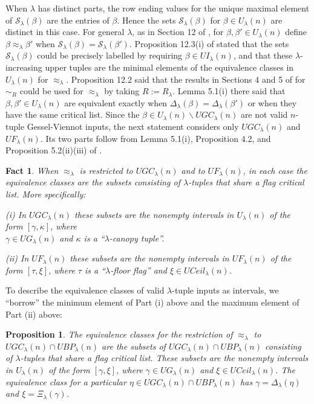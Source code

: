 \documentclass[11pt]{article}
\newtheorem{prop}[thm]{Proposition}
\newtheorem{fact}[thm]{Fact}
\theoremstyle{definition}
\theoremstyle{remark}
\numberwithin{equation}{section}
\begin{document}
\begin{spacing}{1.35}
When $\lambda$ has distinct parts, the row ending values for the unique maximal element of $\mathcal{S}_\lambda(\beta)$ are the entries of $\beta$.  Hence the sets $\mathcal{S}_\lambda(\beta)$ for $\beta \in U_\lambda(n)$ are distinct in this case.  For general $\lambda$, as in Section 12 of \cite{PW}, for $\beta, \beta' \in U_\lambda(n)$ define $\beta \approx_\lambda \beta'$ when $\mathcal{S}_\lambda(\beta) = \mathcal{S}_\lambda(\beta')$.  Proposition 12.3(i) of \cite{PW} stated that the sets $\mathcal{S}_\lambda(\beta)$ could be precisely labelled by requiring $\beta \in UI_\lambda(n)$, and that these $\lambda$-increasing upper tuples are the minimal elements of the equivalence classes in $U_\lambda(n)$ for $\approx_\lambda$.  Proposition 12.2 said that the results in Sections 4 and 5 of \cite{PW} for $\sim_R$ could be used for $\approx_\lambda$ by taking $R := R_\lambda$.  Lemma 5.1(i) there said that $\beta, \beta' \in U_\lambda(n)$ are equivalent exactly when $\Delta_\lambda(\beta) = \Delta_\lambda(\beta')$ or when they have the same critical list.  Since the $\beta \in U_\lambda(n) \backslash UGC_\lambda(n)$ are not valid $n$-tuple Gessel-Viennot inputs, the next statement considers only $UGC_\lambda(n)$ and $UF_\lambda(n)$.  Its two parts follow from Lemma 5.1(i), Proposition 4.2, and Proposition 5.2(ii)(iii) of \cite{PW}.

\begin{fact}\label{fact826.3}When $\approx_\lambda$ is restricted to $UGC_\lambda(n)$ and to $UF_\lambda(n)$, in each case the equivalence classes are the subsets consisting of $\lambda$-tuples that share a flag critical list.  More specifically:

\noindent (i)  In $UGC_\lambda(n)$ these subsets are the nonempty intervals in $U_\lambda(n)$ of the form $[\gamma, \kappa]$, where \\ $\gamma \in UG_\lambda(n)$ and $\kappa$ is a ``$\lambda$-canopy tuple''.

\noindent(ii)  In $UF_\lambda(n)$ these subsets are the nonempty intervals in $UF_\lambda(n)$ of the form $[\tau, \xi]$, where $\tau$ is a ``$\lambda$-floor flag'' and $\xi \in UCeil_\lambda(n)$.  \end{fact}



To describe the equivalence classes of valid $\lambda$-tuple inputs as intervals, we ``borrow'' the minimum element of Part (i) above and the maximum element of Part (ii) above:

\begin{prop}\label{prop826.6}The equivalence classes for the restriction of $\approx_\lambda$ to $UGC_\lambda(n) \cap UBP_\lambda(n)$ are the subsets of $UGC_\lambda(n) \cap UBP_\lambda(n)$ consisting of $\lambda$-tuples that share a flag critical list.  These subsets are the nonempty intervals in $U_\lambda(n)$ of the form $[\gamma, \xi]$, where $\gamma \in UG_\lambda(n)$ and $\xi \in UCeil_\lambda(n)$.  The equivalence class for a particular $\eta \in UGC_\lambda(n) \cap UBP_\lambda(n)$ has $\gamma = \Delta_\lambda(\eta)$ and $\xi = \Xi_\lambda(\gamma)$. \end{prop}


\end{spacing}
\end{document}
